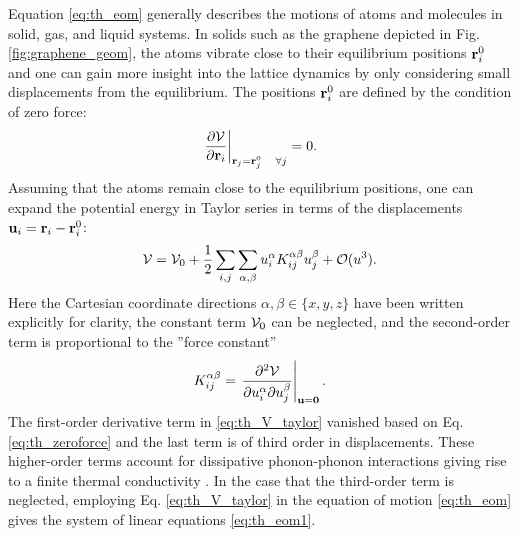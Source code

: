 
Equation \eqref{eq:th_eom} generally describes the motions of atoms and molecules in solid, gas, and liquid systems. In solids such as the graphene depicted in Fig. \ref{fig:graphene_geom}, the atoms vibrate close to their equilibrium positions $\mathbf{r}_i^0$ and one can gain more insight into the lattice dynamics by only considering small displacements from the equilibrium. The positions $\mathbf{r}_i^0$ are defined by the condition of zero force:
\begin{equation}
 \left. \frac{\partial \mathcal{V}}{\partial \mathbf{r}_i} \right|_{\mathbf{r}_j=\mathbf{r}_j^0 \quad \forall j} = 0. \label{eq:th_zeroforce}
\end{equation}
Assuming that the atoms remain close to the equilibrium positions, one can expand the potential energy in Taylor series in terms of the displacements $\mathbf{u}_i=\mathbf{r}_i-\mathbf{r}_i^0$:
\begin{equation}
 \mathcal{V} = \mathcal{V}_0 + \frac{1}{2} \sum_{i,j} \sum_{\alpha,\beta} u_i^{\alpha} K_{ij}^{\alpha \beta} u_j^{\beta}  + \mathcal{O}(u^3). \label{eq:th_V_taylor}
\end{equation}
Here the Cartesian coordinate directions $\alpha,\beta \in \{x,y,z\}$ have been written explicitly for clarity, the constant term $\mathcal{V}_0$ can be neglected, and the second-order term is proportional to the ''force constant''
\begin{equation}
 K_{ij}^{\alpha\beta} = \left. \frac{\partial^2 \mathcal{V}}{\partial u_i^{\alpha} \partial u_j^{\beta}} \right|_{\mathbf{u}=\mathbf{0}}. \label{eq:th_K_def}
\end{equation}
The first-order derivative term in \eqref{eq:th_V_taylor} vanished based on Eq. \eqref{eq:th_zeroforce} and the last term is of third order in displacements. These higher-order terms account for dissipative phonon-phonon interactions giving rise to a finite thermal conductivity \cite{ziman}. In the case that the third-order term is neglected, employing Eq. \eqref{eq:th_V_taylor} in the equation of motion \eqref{eq:th_eom} gives the system of linear equations \eqref{eq:th_eom1}. 

